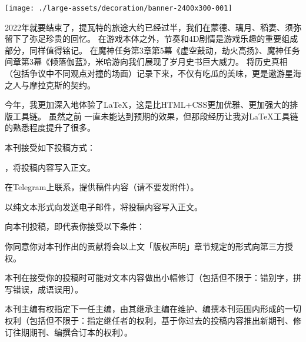 


\isDraft
\noindent\texttt{[image: ./large-assets/decoration/banner-2400x300-001]}\par
\tableofcontents\clearpage






\dividearticles
{}

2022年就要结束了，提瓦特的旅途大约已经过半，我们在蒙德、璃月、稻妻、须弥留下了弥足珍贵的回忆。
在游戏本体之外，节奏和4D剧情是游戏乐趣的重要组成部分，同样值得铭记。
在魔神任务第3章第5幕《虚空鼓动，劫火高扬》、魔神任务间章第3幕《倾落伽蓝》，米哈游向我们展现了岁月史书巨大威力。
将历史真相（包括争议中不同观点对撞的场面）记录下来，不仅有吃瓜的美味，更是遨游星海之人与摩拉克斯的契约。

今年，我更加深入地体验了LaTeX，这是比HTML+CSS更加优雅、更加强大的排版工具链。
虽然之前\href{https://neruthesgithubdistweb.vercel.app/qyxt/qyxt/qyxt-2022-02.pdf}{}%
一直未能达到预期的效果，但那段经历让我对LaTeX工具链的熟悉程度提升了很多。


本刊接受如下投稿方式：

\begin{compactitem}
	\item \href{https://github.com/neruthes/ysplayerjournal}{}，将投稿内容写入正文。
	\item 在Telegram上联系\CJKecglue\href{https://t.me/neruthes}{}，提供稿件内容（请不要发附件）。
	\item 以纯文本形式向发送电子邮件，将投稿内容写入正文。
\end{compactitem}

向本刊投稿，即代表你接受以下条件：

\begin{compactitem}
	\item 你同意你对本刊作出的贡献将会以上文「版权声明」章节规定的形式向第三方授权。
	\item 本刊在接受你的投稿时可能对文本内容做出小幅修订（包括但不限于：错别字，拼写错误，成语误用）。
	\item 本刊主编有权指定下一任主编，由其继承主编在维护、编撰本刊范围内形成的一切权利（包括但不限于：指定继任者的权利，基于你过去的投稿内容推出新期刊、修订往期期刊、编撰合订本的权利）。
\end{compactitem}






